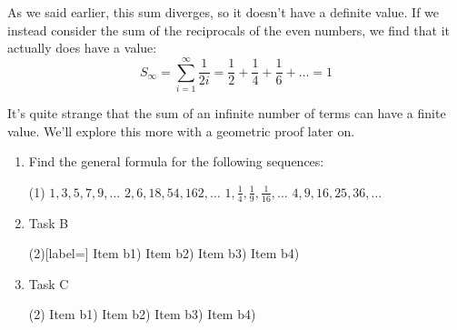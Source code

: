 As we said earlier, this sum diverges, so it doesn't have a definite value. If we instead consider the sum of the 
reciprocals of the even numbers, we find that it actually does have a value:
\begin{equation*}
  S_\infty = \sum_{i=1}^{\infty} \frac{1}{2i} = \frac{1}{2} + \frac{1}{4} + \frac{1}{6} + \ldots = 1
\end{equation*}

It's quite strange that the sum of an infinite number of terms can have a finite value. We'll explore this more 
with a geometric proof later on.

\begin{exercises}
\end{exercises}
\begin{questions}
  \begin{multicols}{2}
    \begin{enumerate}[label = \alph*), wide, leftmargin = *, itemsep = 1ex, after = \setcounter{enumi}{0}]
      \item Find the general formula for the following sequences:
      \begin{tasks}[label=\roman*)](1)
        \task $1, 3, 5, 7, 9, \ldots$
        \task $2, 6, 18, 54, 162, \ldots$
        \task $1, \frac{1}{4}, \frac{1}{9}, \frac{1}{16}, \ldots$
        \task $4, 9, 16, 25, 36, \ldots$
      \end{tasks}
      \vfill\null
      \columnbreak
      \item Task B
      \begin{tasks}(2)[label=\roman*]
      \task Item b1)
      \task Item b2)
      \task Item b3)
      \task Item b4)
      \end{tasks}
          \item Task C \begin{tasks}(2)
      \task Item b1)
      \task Item b2)
      \task Item b3)
      \task Item b4)
      \end{tasks}
    \end{enumerate}
  \end{multicols}
\end{questions}
